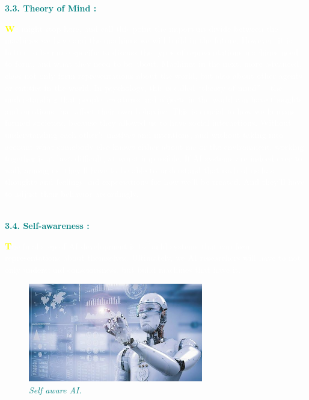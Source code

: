 \documentclass[12pt]{article}
\begin{document}
\begin{large}
\textbf{\textcolor{teal}{3.3. Theory of Mind :}}\\
\end{large}

\textcolor{white}{\textbf{\textcolor{yellow}{\huge W}}e might stop here, and call this point the important divide between the machines we have and the machines we will build in the future. However, it is better to be more specific to discuss the types of representations machines need to form, and what they need to be about.
Machines in the next, more advanced, class not only form representations about the world, but also about other agents or entities in the world. In psychology, this is called “theory of mind” – the understanding that people, creatures and objects in the world can have thoughts and emotions that affect their own behavior.
This is crucial to how we humans formed societies, because they allowed us to have social interactions. Without understanding each other’s motives and intentions, and without taking into account what somebody else knows either about me or the environment, working together is at best difficult, at worst impossible.
If AI systems are indeed ever to walk among us, they’ll have to be able to understand that each of us has thoughts and feelings and expectations for how we’ll be treated. And they’ll have to adjust their behavior accordingly.}\\\\

\begin{large}
\textbf{\textcolor{teal}{3.4. Self-awareness :}}\\
\end{large}

\textcolor{white}{\textbf{\textcolor{yellow}{\huge T}}he final step of AI development is to build systems that can form representations about themselves. Ultimately, we AI researchers will have to not only understand consciousness, but build machines that have it.}

\begin{figure}
\centering
\includegraphics[width=3in]{self_aware_AI_26_Sept_2019.5d8d059954337}
\caption{\textit{\textcolor{teal}{Self aware AI.}}}
\end{figure}
\end{document}
